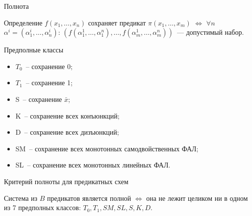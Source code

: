 \documentclass{beamer}
\begin{document}
\begin{frame}{Полнота}
        \begin{block}{Определение}
        $f (x_1, \ldots, x_n)$ сохраняет предикат $\pi(x_1, \ldots, x_m)$ $\iff$ $\forall n$  
        $\alpha^i = (\alpha_1^i, \ldots, \alpha_n^i)$: 
        $( f(\alpha_1^1, \ldots, \alpha_1^n), \ldots, f(\alpha_m^1, \ldots, \alpha_m^n) )$~--- допустимый набор.
        \end{block}

    \begin{block}{Предполные классы}
        \begin{itemize}
            \item{$T_0$}~-- сохранение 0;
            \item{$T_1$}~-- сохранение 1;
            \item{S}~-- сохранение $\bar{x}$;
            \item{K}~-- сохранение всех конъюнкций;
            \item{D}~-- сохранение всех дизъюнкций;
            \item{SM}~-- сохранение всех монотонных самодвойственных ФАЛ;
            \item{SL}~-- сохранение всех монотонных линейных ФАЛ.
        \end{itemize}
    \end{block}
\end{frame}

\begin{frame}{Критерий полноты для предикатных схем}
    \begin{block}{}
    \label{Post}
    Система из $B$ предикатов является полной $\iff$
    она не лежит целиком ни в одном из 7 предполных классов: $T_0, T_1, SM, SL, S, K, D$. 
    \end{block}
\end{frame}
\end{document}
